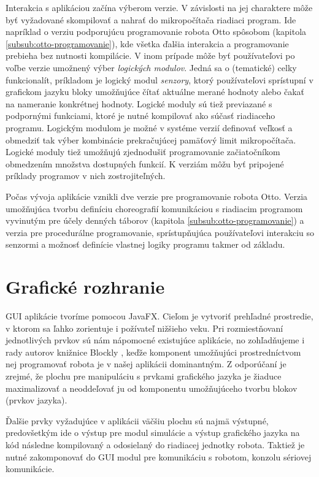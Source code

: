 Interakcia s aplikáciou začína výberom verzie. V závislosti na jej charaktere môže byť vyžadované skompilovať a nahrať do mikropočítača riadiaci program. Ide napríklad o verziu podporujúcu programovanie robota Otto spôsobom  (kapitola \ref{subsub:otto-programovanie}), kde všetka ďalšia interakcia a programovanie prebieha bez nutnosti kompilácie. V inom prípade môže byť používateľovi po voľbe verzie umožnený výber \textit{logických modulov}. Jedná sa o (tematické) celky funkcionalít, príkladom je logický modul \textit{senzory}, ktorý používateľovi sprístupní v grafickom jazyku bloky umožňujúce čítať aktuálne merané hodnoty alebo čakať na nameranie konkrétnej hodnoty. Logické moduly sú tiež previazané s podpornými funkciami, ktoré je nutné kompilovať ako súčasť riadiaceho programu. Logickým modulom je možné v systéme verzií definovať veľkosť a obmedziť tak výber kombinácie prekračujúcej pamäťový limit mikropočítača. Logické moduly tiež umožňujú zjednodušiť programovanie začiatočníkom obmedzením množstva dostupných funkcií. K verziám môžu byť pripojené príklady programov v nich zostrojiteľných.

Počas vývoja aplikácie vznikli dve verzie pre programovanie robota Otto. Verzia umožňujúca tvorbu definíciu choreografií komunikáciou s riadiacim programom vyvinutým pre účely denných táborov (kapitola \ref{subsub:otto-programovanie}) a verzia pre procedurálne programovanie, sprístupňujúca používateľovi interakciu so senzormi a možnosť definície vlastnej logiky programu takmer od základu.


\section{Grafické rozhranie}
GUI aplikácie tvoríme pomocou JavaFX. Cieľom je vytvoriť prehľadné prostredie, v ktorom sa ľahko zorientuje i požívateľ nižšieho veku. Pri rozmiestňovaní jednotlivých prvkov sú nám nápomocné existujúce aplikácie, no zohľadňujeme i rady autorov knižnice Blockly \cite{blocklyBestPractices}, keďže komponent umožňujúci prostredníctvom nej programovať robota je v našej aplikácii dominantným. Z odporúčaní je zrejmé, že plochu pre manipuláciu s prvkami grafického jazyka je žiaduce maximalizovať a neoddeľovať ju od komponentu umožňujúceho tvorbu blokov (prvkov jazyka).

Ďalšie prvky vyžadujúce v aplikácii väčšiu plochu sú najmä výstupné, predovšetkým ide o výstup pre modul simulácie a výstup  grafického jazyka na kód následne kompilovaný a odosielaný do riadiacej jednotky robota. Taktiež je nutné zakomponovať do GUI modul pre komunikáciu s robotom, konzolu sériovej komunikácie.


